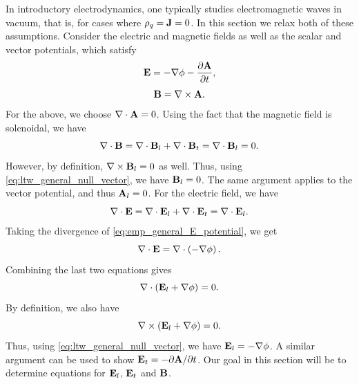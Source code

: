 \documentclass[a4paper,11pt]{report}
\begin{document}
\label{sec:electromagnetic_waves_plasmas}
In introductory electrodynamics, one typically studies electromagnetic waves in vacuum, that is, for cases where $\rho_q = \mathbf{J} = 0$. In this section we relax both of these assumptions. Consider the electric and magnetic fields as well as the scalar and vector potentials, which satisfy
\begin{equation}
    \label{eq:emp_general_E_potential}
    \mathbf{E} = -\nabla \phi - \frac{\partial \mathbf{A}}{\partial t},
\end{equation}
\begin{equation}
    \label{eq:emp_general_B_potential}
    \mathbf{B} = \nabla \times \mathbf{A}.
\end{equation}
For the above, we choose $\nabla \cdot \mathbf{A} = 0$. Using the fact that the magnetic field is solenoidal, we have
\begin{equation*}
    \nabla \cdot \mathbf{B} = \nabla \cdot \mathbf{B}_l + \nabla \cdot \mathbf{B}_t = \nabla \cdot \mathbf{B}_l = 0.
\end{equation*}
However, by definition, $\nabla \times \mathbf{B}_l = 0$ as well. Thus, using \cref{eq:ltw_general_null_vector}, we have $\mathbf{B}_l = 0$. The same argument applies to the vector potential, and thus $\mathbf{A}_l = 0$. For the electric field, we have
\begin{equation*}
    \nabla \cdot \mathbf{E} = \nabla \cdot \mathbf{E}_l + \nabla \cdot \mathbf{E}_t = \nabla \cdot \mathbf{E}_l .
\end{equation*}
Taking the divergence of \cref{eq:emp_general_E_potential}, we get
\begin{equation}
    \nabla \cdot \mathbf{E} = \nabla \cdot \left ( -\nabla \phi \right ).
\end{equation}
Combining the last two equations gives
\begin{equation*}
    \nabla \cdot \left ( \mathbf{E}_l + \nabla \phi \right ) = 0.
\end{equation*}
By definition, we also have
\begin{equation*}
    \nabla \times \left ( \mathbf{E}_l + \nabla \phi \right ) = 0.
\end{equation*}
Thus, using \cref{eq:ltw_general_null_vector}, we have $\mathbf{E}_l = -\nabla \phi$. A similar argument can be used to show $\mathbf{E}_t = -\partial \mathbf{A} / \partial t$. Our goal in this section will be to determine equations for $\mathbf{E}_l$, $\mathbf{E}_t$ and $\mathbf{B}$.
\end{document}
